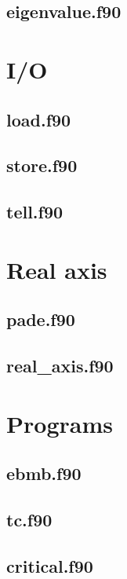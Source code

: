 

\subsection{eigenvalue.f90}



\section{I/O}

\subsection{load.f90}



\subsection{store.f90}



\subsection{tell.f90}



\section{Real axis}
\label{real_axis}

\subsection{pade.f90}



\subsection{real\_axis.f90}



\section{Programs}

\subsection{ebmb.f90}



\subsection{tc.f90}



\subsection{critical.f90}


